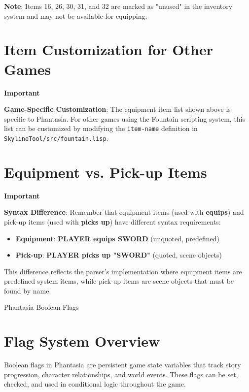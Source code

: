 \documentclass[11pt,letterpaper,oldstylefigures]{memoir}
\makeatletter
\newenvironment{Important}
{\begingroup
\small
\setlength{\parindent}{0pt}
\setlength{\parskip}{0.5em}
\allowdisplaybreaks
\setlength{\displaywidowpenalty}{0}
\setlength{\widowpenalty}{0}
\setlength{\clubpenalty}{0}
\setlength{\interlinepenalty}{0}
\begin{tcolorbox}[
    colback=yellow!5,
    colframe=yellow!75!black,
    boxrule=0.5pt,
    arc=2pt,
    left=0.5em,
    right=0.5em,
    top=0.25em,
    bottom=0.25em
]
\textbf{Important}
\end{tcolorbox}\par
}
{\endgroup}
\let\oldchapter\chapter
\def\chapter{%
  \@ifstar
    {\FountainScripting@starchapter}%
    {\@dblarg\FountainScripting@chapter}}
\def\FountainScripting@starchapter#1{\oldchapter*{#1}\chaptermark{#1}}
\def\FountainScripting@chapter[#1]#2{\oldchapter[#1]{#2}\chaptermark{#2}}
\newcommand{\fountain}[1]{\textbf{#1}}
\newcommand{\Phantasia}{{\irishfont Phantasia}}
\makeatother
\begin{document}
\textbf{Note}: Items 16, 26, 30, 31, and 32 are marked as "unused" in the inventory system and may not be available for equipping.

\section{Item Customization for Other Games}

\begin{Important}
\textbf{Game-Specific Customization}: The equipment item list shown above is specific to \Phantasia{}. For other games using the Fountain scripting system, this list can be customized by modifying the \texttt{item-name} definition in \texttt{SkylineTool/src/fountain.lisp}.
\end{Important}

\section{Equipment vs. Pick-up Items}

\begin{Important}
\textbf{Syntax Difference}: Remember that equipment items (used with \fountain{equips}) and pick-up items (used with \fountain{picks up}) have different syntax requirements:
\end{Important}

\begin{itemize}
\item \textbf{Equipment}: \fountain{PLAYER equips SWORD} (unquoted, predefined)
\item \textbf{Pick-up}: \fountain{PLAYER picks up "SWORD"} (quoted, scene objects)
\end{itemize}

This difference reflects the parser's implementation where equipment items are predefined system items, while pick-up items are scene objects that must be found by name.

\chapter{\Phantasia{} Boolean Flags}
\label{app:boolean-flags}

\section{Flag System Overview}

Boolean flags in \Phantasia{} are persistent game state variables that track story progression, character relationships, and world events. These flags can be set, checked, and used in conditional logic throughout the game.
\end{document}
